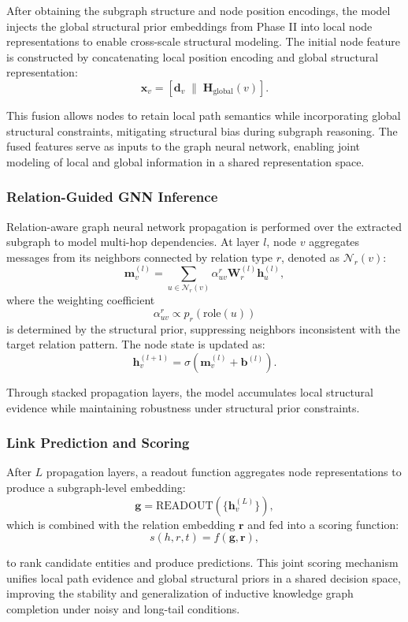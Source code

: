 \documentclass[preprint,12pt]{elsarticle}
\begin{document}
After obtaining the subgraph structure and node position encodings, the model injects the global structural prior embeddings from Phase II into local node representations to enable cross-scale structural modeling. The initial node feature is constructed by concatenating local position encoding and global structural representation:
\[
\mathbf{x}_v = [\mathbf{d}_v \;\|\; \mathbf{H}_{\text{global}}(v)].
\]

This fusion allows nodes to retain local path semantics while incorporating global structural constraints, mitigating structural bias during subgraph reasoning. The fused features serve as inputs to the graph neural network, enabling joint modeling of local and global information in a shared representation space.

\subsubsection{Relation-Guided GNN Inference}

Relation-aware graph neural network propagation is performed over the extracted subgraph to model multi-hop dependencies. At layer $l$, node $v$ aggregates messages from its neighbors connected by relation type $r$, denoted as $\mathcal{N}_r(v)$:
\[
\mathbf{m}_v^{(l)}=\sum_{u\in\mathcal{N}_r(v)}
\alpha_{uv}^r \mathbf{W}_r^{(l)}\mathbf{h}_u^{(l)},
\]
where the weighting coefficient
\[
\alpha_{uv}^r \propto p_r(\text{role}(u))
\]
is determined by the structural prior, suppressing neighbors inconsistent with the target relation pattern. The node state is updated as:
\[
\mathbf{h}_v^{(l+1)}=\sigma(\mathbf{m}_v^{(l)}+\mathbf{b}^{(l)}).
\]

Through stacked propagation layers, the model accumulates local structural evidence while maintaining robustness under structural prior constraints.

\subsubsection{Link Prediction and Scoring}

After $L$ propagation layers, a readout function aggregates node representations to produce a subgraph-level embedding:
\[
\mathbf{g}=\text{READOUT}(\{\mathbf{h}_v^{(L)}\}),
\]
which is combined with the relation embedding $\mathbf{r}$ and fed into a scoring function:
\[
s(h,r,t)=f(\mathbf{g},\mathbf{r}),
\]

to rank candidate entities and produce predictions. This joint scoring mechanism unifies local path evidence and global structural priors in a shared decision space, improving the stability and generalization of inductive knowledge graph completion under noisy and long-tail conditions.
\end{document}
